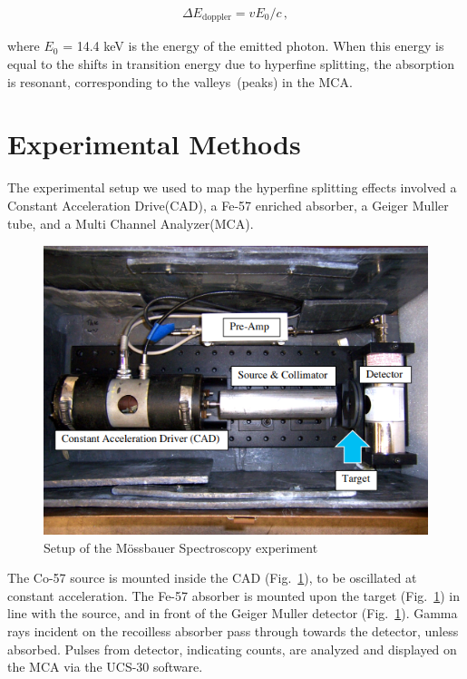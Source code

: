 \documentclass[letterpaper,12pt]{article}
\begin{document}
    \begin{eqnarray}
        \Delta E_{\mathrm{doppler}} = vE_{0}/c \label{eqn:doppler}\,,
    \end{eqnarray}

    where $E_{0}$ = 14.4 keV is the energy of the emitted photon. When this energy is equal to the shifts in transition energy due to hyperfine splitting, the absorption is resonant, corresponding to the valleys~(peaks) in the MCA.




\section{Experimental Methods}

The experimental setup we used to map the hyperfine splitting effects involved a Constant Acceleration Drive(CAD), a Fe-57 enriched absorber, a Geiger Muller tube, and a Multi Channel Analyzer(MCA). 

\begin{figure}[ht] 
        \centering \includegraphics[scale=0.5]{Setup.png}
        \caption{
                \label{fig:setup}
                Setup of the Mössbauer Spectroscopy experiment
        }
\end{figure}  

The Co-57 source is mounted inside the CAD (Fig.~\ref{fig:setup}), to be oscillated at constant acceleration. The Fe-57 absorber is mounted upon the target (Fig.~\ref{fig:setup}) in line with the source, and in front of the Geiger Muller detector (Fig.~\ref{fig:setup}). Gamma rays incident on the recoilless absorber pass through towards the detector, unless absorbed. Pulses from detector, indicating counts, are analyzed and displayed on the MCA via the UCS-30 software. 
\end{document}
